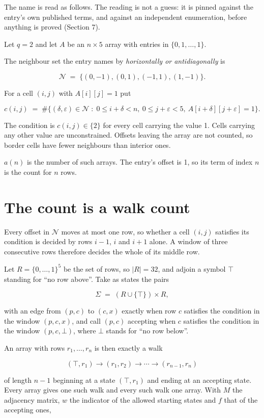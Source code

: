 \documentclass[11pt]{article}
\theoremstyle{definition}
\begin{document}
The name is read as follows. The reading is not a guess: it is pinned against the entry's own published terms, and against an independent enumeration, before anything is proved (Section 7).

Let $q = 2$ and let $A$ be an $n \times 5$ array with entries in $\{0,1,\dots,1\}$.

The neighbour set the entry names by {\itshape horizontally or antidiagonally} is

\[\mathcal{N} \;=\; \{(0,-1), (0,1), (-1,1), (1,-1)\}.\]

For a cell $(i,j)$ with $A[i][j] = 1$ put

\[c(i,j) \;=\; \#\bigl\{(\delta,\varepsilon)\in\mathcal{N} \;:\; 0\le i+\delta<n,\ 0\le j+\varepsilon<5,\ A[i+\delta][j+\varepsilon] = 1\bigr\}.\]

The condition is $c(i,j) \in \{2\}$ for every cell carrying the value 1. Cells carrying any other value are unconstrained. Offsets leaving the array are not counted, so border cells have fewer neighbours than interior ones.

$a(n)$ is the number of such arrays. The entry's offset is 1, so its term of index $n$ is the count for $n$ rows.

\section{The count is a walk count}

Every offset in $\mathcal{N}$ moves at most one row, so whether a cell $(i,j)$ satisfies its condition is decided by rows $i-1$, $i$ and $i+1$ alone. A window of three consecutive rows therefore decides the whole of its middle row.

Let $R = \{0,\dots,1\}^{5}$ be the set of rows, so $|R| = 32$, and adjoin a symbol $\top$ standing for ``no row above''. Take as states the pairs

\[\Sigma \;=\; (R \cup \{\top\}) \times R,\]

with an edge from $(p,c)$ to $(c,x)$ exactly when row $c$ satisfies the condition in the window $(p,c,x)$, and call $(p,c)$ accepting when $c$ satisfies the condition in the window $(p,c,\bot)$, where $\bot$ stands for ``no row below''.

An array with rows $r_1,\dots,r_n$ is then exactly a walk

\[(\top,r_1) \to (r_1,r_2) \to \cdots \to (r_{n-1},r_n)\]

of length $n-1$ beginning at a state $(\top,r_1)$ and ending at an accepting state. Every array gives one such walk and every such walk one array. With $M$ the adjacency matrix, $w$ the indicator of the allowed starting states and $f$ that of the accepting ones,
\end{document}
